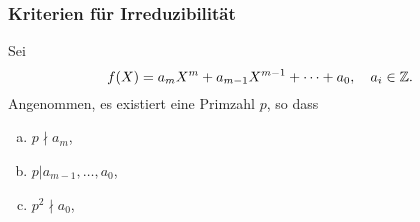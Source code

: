 \documentclass[
 a4paper,
 12pt,
 parskip=half
 ]{scrreprt}
\theoremstyle{plain}
\theoremstyle{definition}
\numberwithin{equation}{chapter}
\numberwithin{thm}{chapter}
\begin{document}
\subsubsection*{Kriterien für Irreduzibilität}
\begin{dis}
  Sei
  \[ f(X) = a_m X^m + a_{m-1} X^{m-1} + \cdots + a_0, \quad a_i \in \mathbb{Z}. \]
  Angenommen, es existiert eine Primzahl $p$, so dass
  \begin{enumerate}[a)]
  \item $p \nmid a_m$,
  \item $p | a_{m-1}, \ldots, a_0$,
  \item $p^2 \nmid a_0$,
  \end{enumerate}
\end{dis}
\end{document}
